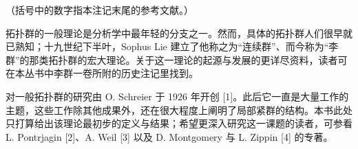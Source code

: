 
（括号中的数字指本注记末尾的参考文献。）

拓扑群的一般理论是分析学中最年轻的分支之一。然而，具体的拓扑群人们很早就已熟知；十九世纪下半叶，Sophus Lie 建立了他称之为“连续群”、而今称为“李群”的那类拓扑群的宏大理论。关于这一理论的起源与发展的更详尽资料，读者可在本丛书中李群一卷所附的历史注记里找到。

对一般拓扑群的研究由 O. Schreier 于 1926 年开创 {[}1{]}。此后它一直是大量工作的主题，这些工作除其他成果外，还在很大程度上阐明了局部紧群的结构。本书此处只打算给出该理论最初步的定义与结果；希望更深入研究这一课题的读者，可参看 L. Pontrjagin {[}2{]}、A. Weil {[}3{]} 以及 D. Montgomery 与 L. Zippin {[}4{]} 的专著。

